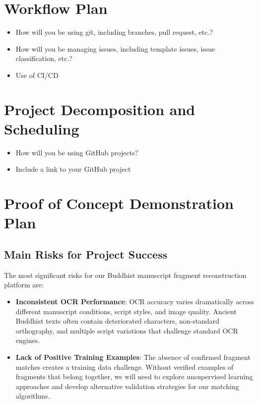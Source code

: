 \documentclass{article}
\begin{document}
\section{Workflow Plan}

\begin{itemize}
	\item How will you be using git, including branches, pull request, etc.?
	\item How will you be managing issues, including template issues, issue
	classification, etc.?
  \item Use of CI/CD
\end{itemize}

\section{Project Decomposition and Scheduling}

\begin{itemize}
  \item How will you be using GitHub projects?
  \item Include a link to your GitHub project
\end{itemize}


\section{Proof of Concept Demonstration Plan}

\subsection{Main Risks for Project Success}

The most significant risks for our Buddhist manuscript fragment reconstruction platform are:

\begin{itemize}
\item \textbf{Inconsistent OCR Performance}: OCR accuracy varies dramatically across different manuscript conditions, script styles, and image quality. Ancient Buddhist texts often contain deteriorated characters, non-standard orthography, and multiple script variations that challenge standard OCR engines.


\item \textbf{Lack of Positive Training Examples}: The absence of confirmed fragment matches creates a training data challenge. Without verified examples of fragments that belong together, we will need to explore unsupervised learning approaches and develop alternative validation strategies for our matching algorithms.
\end{itemize}
\end{document}
